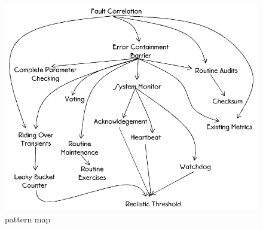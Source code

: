 \begin{figure}
	\centering
	\includegraphics[width=\textwidth]{content/faulttolerance/images/pattern_map.png}
	\caption{pattern map}
\end{figure}


